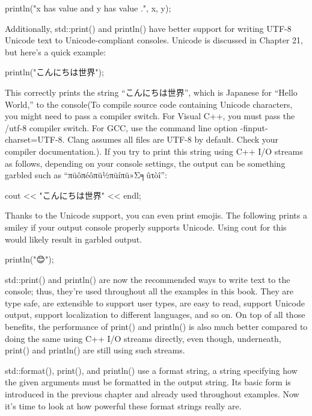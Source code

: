 \begin{cpp}
println("x has value {} and y has value {}.", x, y);
\end{cpp}

Additionally, std::print() and println() have better support for writing UTF-8 Unicode text to Unicode-compliant consoles. Unicode is discussed in Chapter 21, but here’s a quick example:

\begin{cpp}
println("こんにちは世界");
\end{cpp}

This correctly prints the string “こんにちは世界”, which is Japanese for “Hello World,” to the console(To compile source code containing Unicode characters, you might need to pass a compiler switch. For Visual C++, you must pass the /utf-8 compiler switch. For GCC, use the command line option -finput-charset=UTF-8. Clang assumes all files are UTF-8 by default. Check your compiler documentation.). If you try to print this string using C++ I/O streams as follows, depending on your console settings, the output can be something garbled such as “πüôπéôπü½πüíπü»Σ╕ûτòî”:

\begin{cpp}
cout << "こんにちは世界" << endl;
\end{cpp}

Thanks to the Unicode support, you can even print emojis. The following prints a smiley if your output console properly supports Unicode. Using cout for this would likely result in garbled output.

\newfontfamily{}
println("{\emojifont 😊}");


std::print() and println() are now the recommended ways to write text to the console; thus, they’re used throughout all the examples in this book. They are type safe, are extensible to support user types, are easy to read, support Unicode output, support localization to different languages, and so on. On top of all those benefits, the performance of print() and println() is also much better compared to doing the same using C++ I/O streams directly, even though, underneath, print() and println() are still using such streams.


std::format(), print(), and println() use a format string, a string specifying how the given arguments must be formatted in the output string. Its basic form is introduced in the previous chapter and already used throughout examples. Now it’s time to look at how powerful these format strings really are.

